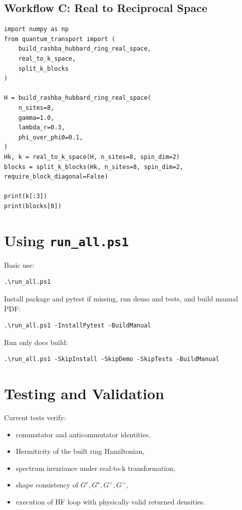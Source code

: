 \documentclass[11pt,a4paper]{article}
\begin{document}
\subsection{Workflow C: Real to Reciprocal Space}
\begin{lstlisting}[style=py]
import numpy as np
from quantum_transport import (
    build_rashba_hubbard_ring_real_space,
    real_to_k_space,
    split_k_blocks
)

H = build_rashba_hubbard_ring_real_space(
    n_sites=8,
    gamma=1.0,
    lambda_r=0.3,
    phi_over_phi0=0.1,
)
Hk, k = real_to_k_space(H, n_sites=8, spin_dim=2)
blocks = split_k_blocks(Hk, n_sites=8, spin_dim=2, require_block_diagonal=False)

print(k[:3])
print(blocks[0])
\end{lstlisting}

\section{Using \texttt{run\_all.ps1}}
Basic use:
\begin{lstlisting}[style=ps]
.\run_all.ps1
\end{lstlisting}

Install package and pytest if missing, run demo and tests, and build manual PDF:
\begin{lstlisting}[style=ps]
.\run_all.ps1 -InstallPytest -BuildManual
\end{lstlisting}

Run only docs build:
\begin{lstlisting}[style=ps]
.\run_all.ps1 -SkipInstall -SkipDemo -SkipTests -BuildManual
\end{lstlisting}

\section{Testing and Validation}
Current tests verify:
\begin{itemize}[leftmargin=1.5em]
  \item commutator and anticommutator identities,
  \item Hermiticity of the built ring Hamiltonian,
  \item spectrum invariance under real-to-k transformation,
  \item shape consistency of \(G^r,G^a,G^<,G^>\),
  \item execution of HF loop with physically valid returned densities.
\end{itemize}
\end{document}
